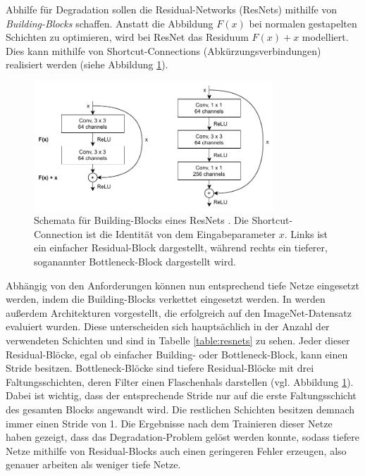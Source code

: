 Abhilfe für Degradation sollen die Residual-Networks (ResNets) mithilfe von
\textit{Building-Blocks} schaffen. Anstatt die Abbildung
$F(x)$ bei normalen gestapelten Schichten zu optimieren, wird bei ResNet das
Residuum $F(x) + x$ modelliert. Dies kann mithilfe von Shortcut-Connections
(Abkürzungsverbindungen) realisiert werden (siehe Abbildung
\ref{fig:resnet-building-block}).

\begin{figure}
    \centering
    \includegraphics[width=0.8\textwidth]{images/resnet_building_block.pdf}
    \caption{Schemata für Building-Blocks eines ResNets \cite{he2015deep}. Die
    Shortcut-Connection ist die Identität von dem Eingabeparameter $x$. Links ist ein einfacher Residual-Block dargestellt, während rechts ein tieferer, soganannter Bottleneck-Block dargestellt wird.}
    \label{fig:resnet-building-block}
\end{figure}

Abhängig von den Anforderungen können nun entsprechend tiefe Netze eingesetzt
werden, indem die Building-Blocks verkettet eingesetzt werden. In
\cite{he2015deep} werden außerdem Architekturen vorgestellt, die
erfolgreich auf den ImageNet-Datensatz \cite{deng2009imagenet} evaluiert wurden.
Diese unterscheiden sich hauptsächlich in der Anzahl der verwendeten Schichten
und sind in Tabelle \ref{table:resnets} zu sehen. Jeder dieser Residual-Blöcke,
egal ob einfacher Building- oder Bottleneck-Block, kann einen Stride besitzen. Bottleneck-Blöcke sind tiefere Residual-Blöcke mit drei Faltungsschichten, deren Filter einen Flaschenhals darstellen (vgl. Abbildung \ref{fig:resnet-building-block}).
Dabei ist wichtig, dass der entsprechende Stride nur auf die erste
Faltungsschicht des gesamten Blocks angewandt wird. Die restlichen Schichten
besitzen demnach immer einen Stride von 1. Die Ergebnisse nach dem Trainieren
dieser Netze haben gezeigt, dass das Degradation-Problem gelöst werden konnte,
sodass tiefere Netze mithilfe von Residual-Blocks auch einen geringeren Fehler
erzeugen, also genauer arbeiten als weniger tiefe Netze.


